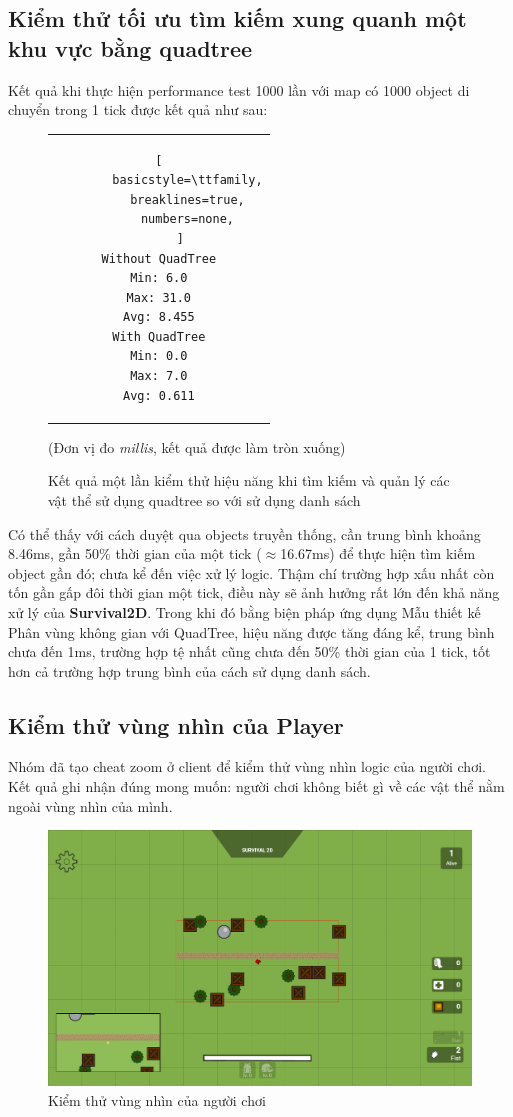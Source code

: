 \documentclass[12pt,a4paper]{article}
\begin{document}
  \subsection{Kiểm thử tối ưu tìm kiếm xung quanh một khu vực bằng quadtree}
  Kết quả khi thực hiện performance test 1000 lần với map có 1000 object di chuyển trong 1 tick được kết quả như sau:
  \begin{figure}[H]
    \centering
    \begin{tabular}{c}
      \begin{lstlisting}[
        basicstyle=\ttfamily,
        breaklines=true,
        numbers=none,
      ]
Without QuadTree
Min: 6.0
Max: 31.0
Avg: 8.455
With QuadTree
Min: 0.0
Max: 7.0
Avg: 0.611
      \end{lstlisting}
    \end{tabular}
    (Đơn vị đo \textit{millis}, kết quả được làm tròn xuống)
    \caption{Kết quả một lần kiểm thử hiệu năng khi tìm kiếm và quản lý các vật thể sử dụng quadtree so với sử dụng danh sách}
    \label{test_quadtree}
  \end{figure}
  Có thể thấy với cách duyệt qua objects truyền thống, cần trung bình khoảng 8.46ms, gần 50\% thời gian của một tick ($\approx$16.67ms) để thực hiện tìm kiếm object gần đó; chưa kể đến việc xử lý logic. Thậm chí trường hợp xấu nhất còn tốn gần gấp đôi thời gian một tick, điều này sẽ ảnh hưởng rất lớn đến khả năng xử lý của \textbf{Survival2D}. Trong khi đó bằng biện pháp ứng dụng Mẫu thiết kế Phân vùng không gian với QuadTree, hiệu năng được tăng đáng kể, trung bình chưa đến 1ms, trường hợp tệ nhất cũng chưa đến 50\% thời gian của 1 tick, tốt hơn cả trường hợp trung bình của cách sử dụng danh sách.

  \subsection{Kiểm thử vùng nhìn của Player}
  Nhóm đã tạo cheat zoom ở client để kiểm thử vùng nhìn logic của người chơi. Kết quả ghi nhận đúng mong muốn: người chơi không biết gì về các vật thể nằm ngoài vùng nhìn của mình.
  \begin{figure}[H]
      \centering
      \includegraphics[width=\textwidth]{Img/testing/player_view.png}
      \caption{Kiểm thử vùng nhìn của người chơi}
  \end{figure}
\end{document}
